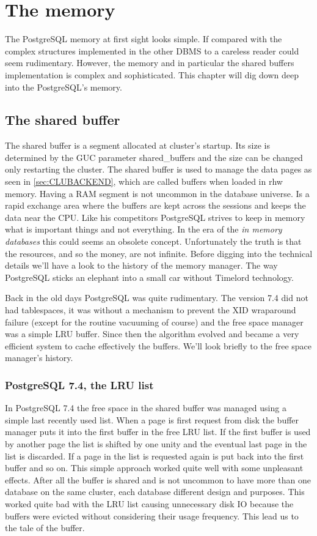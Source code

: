 \chapter{The memory}
\label{ch:PGMEMORY}
The PostgreSQL memory at first sight looks simple. If compared with the complex structures implemented in 
the other DBMS to a careless reader could seem rudimentary. However, the memory and in particular the 
shared buffers implementation is complex and sophisticated. This chapter will dig down deep into the 
PostgreSQL's memory.

\section{The shared buffer}
The shared buffer is a segment allocated at cluster's startup. Its size is determined by the GUC parameter 
shared\_buffers and the size can be changed only restarting the cluster. The shared buffer is used 
to manage the data pages as seen in \ref{sec:CLUBACKEND}, which are called buffers when loaded in 
rhw memory. Having a RAM segment is not uncommon in the database universe. Is a rapid exchange 
area where the buffers are kept across the sessions and keeps the data near the CPU. Like his competitors 
PostgreSQL strives to keep in memory what is important things and not everything. In the era of the 
\textit{in memory databases} this could seems an obsolete concept. Unfortunately the truth is that the 
resources, and so the money, are not infinite. Before digging into the technical details we'll have a look 
to the history of the memory manager. The way PostgreSQL sticks an elephant into a small car without 
Timelord technology.

Back in the old days PostgreSQL was quite rudimentary. The version 7.4 did not had tablespaces, it was 
without a mechanism to prevent the XID wraparound failure (except for the routine vacuuming of course) 
and the free space manager was a simple LRU buffer. Since then the algorithm evolved and became a 
very efficient system to cache effectively the buffers. We'll look briefly to the free space manager's 
history. 

\subsection{PostgreSQL 7.4, the LRU list}
In PostgreSQL 7.4 the free space in the shared buffer was managed using a simple last recently used list. 
When a page is first request from disk the buffer manager puts it into the first buffer in the free LRU 
list. If the first buffer is used by another page the list is shifted by one unity and the eventual last 
page in the list is discarded. If a page in the list is requested again is put back into the first buffer 
and so on. This simple approach worked quite well with some unpleasant effects. After all the buffer is 
shared and is not uncommon to have more than one database on the same cluster, each database different 
design and purposes. This worked quite bad with the LRU list causing unnecessary disk IO because the 
buffers were evicted without considering their usage frequency. This lead us to the tale of the buffer.

